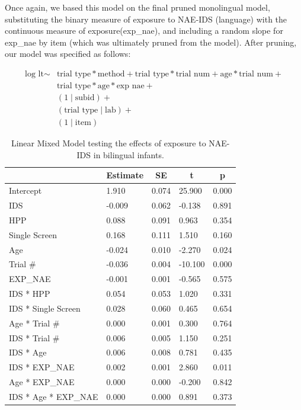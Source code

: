 \documentclass[english,,man,floatsintext]{apa6}
\begin{document}
Once again, we based this model on the final pruned monolingual model, substituting the binary measure of exposure to NAE-IDS (language) with the continuous measure of exposure(exp\_nae), and including a random slope for exp\_nae by item (which was ultimately pruned from the model). After pruning, our model was specified as follows:

\begin{equation}
\begin{split}
\text{log lt} \sim & \text{trial type} * \text{method} + \text{trial type} * \text{trial num} + \text{age} * \text{trial num} + \\
& \text{trial type} * \text{age} * \text{exp nae} + \\
& (1\mid \text{subid}) + \\
& (\text{trial type} \mid \text{lab}) + \\
& (1 \mid \text{item})
\end{split}
\end{equation}

\begin{table}[tbp]

\begin{center}
\begin{threeparttable}

\caption{\label{tab:unnamed-chunk-9}Linear Mixed Model testing the effects of exposure to NAE-IDS in bilingual infants.}

\begin{tabular}{lllll}
\toprule
 & \multicolumn{1}{c}{Estimate} & \multicolumn{1}{c}{SE} & \multicolumn{1}{c}{t} & \multicolumn{1}{c}{p}\\
\midrule
Intercept & 1.910 & 0.074 & 25.900 & 0.000\\
IDS & -0.009 & 0.062 & -0.138 & 0.891\\
HPP & 0.088 & 0.091 & 0.963 & 0.354\\
Single Screen & 0.168 & 0.111 & 1.510 & 0.160\\
Age & -0.024 & 0.010 & -2.270 & 0.024\\
Trial \# & -0.036 & 0.004 & -10.100 & 0.000\\
EXP\_NAE & -0.001 & 0.001 & -0.565 & 0.575\\
IDS * HPP & 0.054 & 0.053 & 1.020 & 0.331\\
IDS * Single Screen & 0.028 & 0.060 & 0.465 & 0.654\\
Age * Trial \# & 0.000 & 0.001 & 0.300 & 0.764\\
IDS * Trial \# & 0.006 & 0.005 & 1.150 & 0.251\\
IDS * Age & 0.006 & 0.008 & 0.781 & 0.435\\
IDS * EXP\_NAE & 0.002 & 0.001 & 2.860 & 0.011\\
Age * EXP\_NAE & 0.000 & 0.000 & -0.200 & 0.842\\
IDS * Age * EXP\_NAE & 0.000 & 0.000 & 0.891 & 0.373\\
\bottomrule
\end{tabular}

\end{threeparttable}
\end{center}

\end{table}
\end{document}

